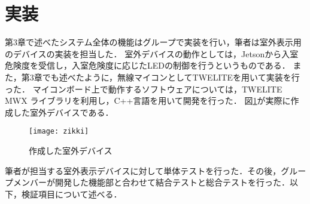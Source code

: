 
\section{実装}

第3章で述べたシステム全体の機能はグループで実装を行い，筆者は室外表示用のデバイスの実装を担当した．
室外デバイスの動作としては，Jetsonから入室危険度を受信し，入室危険度に応じたLEDの制御を行うというものである．
また，第3章でも述べたように，無線マイコンとしてTWELITEを用いて実装を行った．
マイコンボード上で動作するソフトウェアについては，TWELITE MWX ライブラリを利用し，C++言語を用いて開発を行った．
図\ref{zikki}が実際に作成した室外デバイスである．

\begin{figure}
	\centering
	\texttt{[image: zikki]}
	\caption{作成した室外デバイス}
	\label{zikki}
\end{figure}

筆者が担当する室外表示デバイスに対して単体テストを行った．その後，グループメンバーが開発した機能部と合わせて結合テストと総合テストを行った．以下，検証項目について述べる．